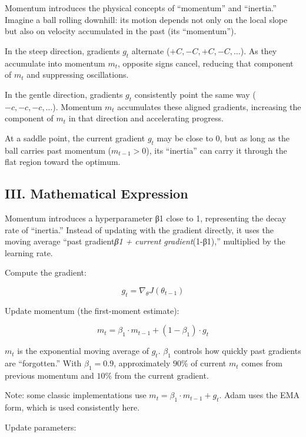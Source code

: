 Momentum introduces the physical concepts of ``momentum'' and ``inertia.'' Imagine a ball rolling downhill: its motion depends not only on the local slope but also on velocity accumulated in the past (its ``momentum'').

In the steep direction, gradients \(g_t\) alternate (\(+C, -C, +C, -C, \ldots\)). As they accumulate into momentum \(m_t\), opposite signs cancel, reducing that component of \(m_t\) and suppressing oscillations.

In the gentle direction, gradients \(g_t\) consistently point the same way (\(-c, -c, -c, \ldots\)). Momentum \(m_t\) accumulates these aligned gradients, increasing the component of \(m_t\) in that direction and accelerating progress.

At a saddle point, the current gradient \(g_t\) may be close to \(0\), but as long as the ball carries past momentum (\(m_{t-1}>0\)), its ``inertia'' can carry it through the flat region toward the optimum.

\hypertarget{iii.-mathematical-expression}{%
\subsection{III. Mathematical Expression}\label{iii.-mathematical-expression}}

Momentum introduces a hyperparameter β1 close to 1, representing the decay rate of ``inertia.'' Instead of updating with the gradient directly, it uses the moving average ``past gradient\emph{β1 + current gradient}(1-β1),'' multiplied by the learning rate.

Compute the gradient:

\[
g_t = \nabla_\theta J(\theta_{t-1})
\]

Update momentum (the first-moment estimate):

\[
m_t = \beta_1 \cdot m_{t-1} + (1-\beta_1)\cdot g_t
\]

\(m_t\) is the exponential moving average of \(g_t\). \(\beta_1\) controls how quickly past gradients are ``forgotten.'' With \(\beta_1=0.9\), approximately \(90\%\) of current \(m_t\) comes from previous momentum and \(10\%\) from the current gradient.

Note: some classic implementations use \(m_t=\beta_1\cdot m_{t-1}+g_t\). Adam uses the EMA form, which is used consistently here.

Update parameters:

